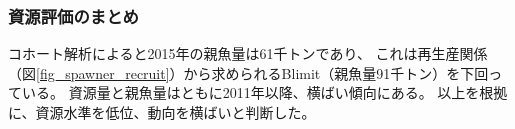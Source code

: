 \subsubsection{資源評価のまとめ}
コホート解析によると2015年の親魚量は61千トンであり、
これは再生産関係（図\ref{fig_spawner_recruit}）から求められるBlimit（親魚量91千トン）を下回っている。
資源量と親魚量はともに2011年以降、横ばい傾向にある。
以上を根拠に、資源水準を低位、動向を横ばいと判断した。
